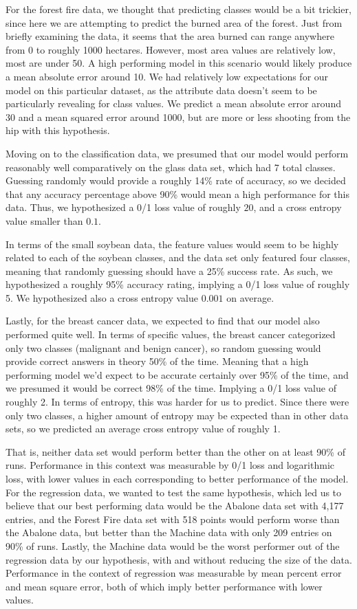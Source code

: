 \documentclass[twoside,11pt]{article}
\begin{document}
  For the forest fire data, we thought that predicting classes would be a bit trickier, since here we are attempting to predict the burned area of the forest.
  Just from briefly examining the data, it seems that the area burned can range anywhere from 0 to roughly 1000 hectares. However, most area values are relatively low,
  most are under 50. A high performing model in this scenario would likely produce a mean absolute error around 10. We had relatively low expectations for our model on
  this particular dataset, as the attribute data doesn't seem to be particularly revealing for class values. We predict a mean absolute error around 30 and a mean squared
  error around 1000, but are more or less shooting from the hip with this hypothesis. 

  Moving on to the classification data, we presumed that our model would perform reasonably well comparatively on the glass data set, which had 7 total classes. Guessing
  randomly would provide a roughly 14\% rate of accuracy, so we decided that any accuracy percentage above 90\% would mean a high performance for this data. Thus, we 
  hypothesized a 0/1 loss value of roughly $20$, and a cross entropy value smaller than $0.1$. 

  In terms of the small soybean data, the feature values would seem to be highly related to each of the soybean classes, and the data set only featured four classes,
  meaning that randomly guessing should have a 25\% success rate. As such, we hypothesized a roughly 95\% accuracy rating, implying a 0/1 loss value of roughly
  5. We hypothesized also a cross entropy value $0.001$ on average.

  Lastly, for the breast cancer data, we expected to find that our model also performed quite well. In terms of specific values, the breast cancer categorized
  only two classes (malignant and benign cancer), so random guessing would provide correct answers in theory 50\% of the time. Meaning that a high performing model
  we'd expect to be accurate certainly over 95\% of the time, and we presumed it would be correct 98\% of the time. Implying a 0/1 loss value of roughly 2. In terms of
  entropy, this was harder for us to predict. Since there were only two classes, a higher amount of entropy may be expected than in other data sets, so we predicted
  an average cross entropy value of roughly 1.

  That is, neither data set would perform better than the other on at least 90\% of runs. Performance in this context was measurable by
  0/1 loss and logarithmic loss, with lower values in each corresponding to better performance of the model. For the regression data, we wanted to
  test the same hypothesis, which led us to believe that our best performing data would be the Abalone data set with 4,177 entries, and the Forest
  Fire data set with 518 points would perform worse than the Abalone data, but better than the Machine data with only 209 entries on 90\% of runs.
  Lastly, the Machine data would be the worst performer out of the regression data by our hypothesis, with and without reducing the size of the data.
  Performance in the context of regression was measurable by mean percent error and mean square error, both of which imply better performance with
  lower values.
\end{document}
